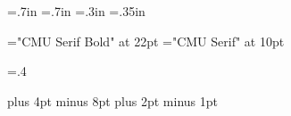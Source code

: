 \def\rmfamily{CMU Serif}
\def\itfamily{CMU Serif Italic}
\def\bffamily{CMU Serif Bold}
\def\slfamily{CMU Serif}
\let\makingcv\relax
{}



\leftmargin=.7in
\rightmargin=.7in
\topmargin=.3in
\bottommargin=.35in
\setuppage

\font\fnad="\bffamily" at 22pt
\font\fcontact="\rmfamily" at 10pt

\long{}

\def\bigstrut{\vrule width 0pt depth .4\baselineskip}

\long{}

\newdimen\splitsizea
\newdimen\splitsizeb
\newdimen\splitpad
\newskip\splitskip
\splitpad=8pt
\splitskip=.4\baselineskip
\def\decora{}
\def\decorb{}

\long{}

\long\def\lin#1#2{%
	\line{%
		\hsize=\splitsizea
		\vtop{\decora{\leavevmode#1}}%
		\hss
		\hsize=\splitsizeb
		\vtop{\decorb{\leavevmode#2}}%
	}%
	\vskip\splitskip
}

\sekcebefore=16pt plus 4pt minus 8pt
\sekceafter=5pt plus 2pt minus 1pt

\def\exp#1#2#3{{\bf #2} – {\csc #1}, {\I #3}}
